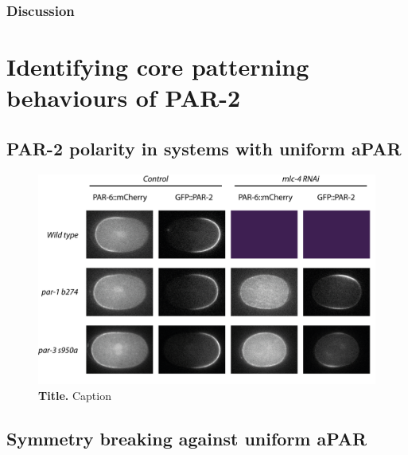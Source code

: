 \documentclass[12pt]{"article"}
\newcommand{\mycaption}[2]{\caption[#1]{\textbf{#1.} #2}}
\begin{document}
\clearpage
\subsubsection{Discussion}

\clearpage
\section{Identifying core patterning behaviours of PAR-2}


\subsection{PAR-2 polarity in systems with uniform aPAR}

\begin{figure}[!h]
\includegraphics[scale=0.9]{uniform_polarity}
\setlength{\abovecaptionskip}{20pt}
\centering
\mycaption{Title}{Caption}
\end{figure}

\clearpage
\subsection{Symmetry breaking against uniform aPAR}
\end{document}
